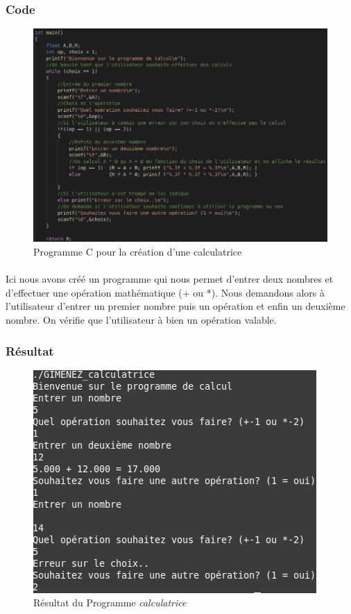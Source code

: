 \documentclass[10pt,a4paper]{article}
\begin{document}
\subsubsection{Code}
	\begin{figure}[h]
	\begin{center}
	\includegraphics[scale=.3]{images/calculatrice_c}
	\end{center}
	\caption{Programme C pour la création d'une calculatrice}
	\end{figure}
\paragraph{}
	Ici nous avons créé un programme qui nous permet d'entrer deux nombres et d'effectuer une opération mathématique (+ ou *). 
	Nous demandons alors à l'utilisateur d'entrer un premier nombre puis un opération et enfin un deuxième nombre. On vérifie que 
	l'utilisateur à bien un opération valable.
\subsubsection{Résultat}
	\begin{figure}[h]
	\begin{center}
	\includegraphics[scale=.3]{images/calculatrice_ex}
	\end{center}
	\caption{Résultat du Programme \emph{calculatrice}}
	\end{figure}
\end{document}

